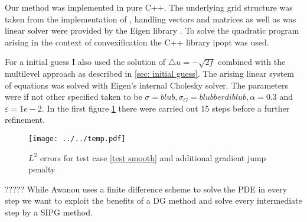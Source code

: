 Our method was implemented in pure C++. The underlying grid structure was taken from the implementation of \cite{BMV2009}, handling vectors and matrices as well as was linear solver were provided by the Eigen library \cite{eigenweb}. To solve the quadratic program arising in the context of convexification the C++ library ipopt \cite{ipopt} was used.

For a initial guess I also used the solution of $\triangle u = -\sqrt{2f}$ combined with the multilevel approach as described in \ref{sec: initial guess}.
The arising linear system of equations was solved with Eigen's internal Cholesky solver.
The parameters were if not other specified taken to be $\sigma=blub, \sigma_G = blubberdiblub, \alpha =
0.3$ and $\varepsilon = 1e-2$.
In the first figure \ref{fig: l2 errors test 1 ourMethod} there were carried out 15 steps before a further refinement.

\begin{figure}[h!]
	\texttt{[image: ../../temp.pdf]}
	\caption{$L^2$ errors for test case \ref{test smooth} and additional gradient jump penalty}
	\label{fig: l2 errors test 1 ourMethod}
\end{figure}


?????
While Awanou uses a finite difference scheme to solve the PDE in every step we want to exploit the benefits of a DG method and solve every intermediate step by a SIPG method. 
